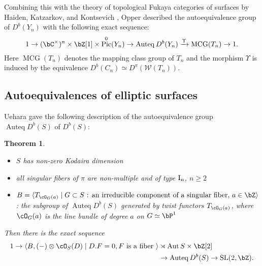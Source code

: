\documentclass[a0,landscape]{a0poster}
\theoremstyle{plain}
\newtheorem{theorem}{Theorem}[section]
\theoremstyle{definition}
\DeclareMathOperator{\Auteq}{\mathrm{Auteq}}
\DeclareMathOperator{\Pic}{\mathrm{Pic}}
\DeclareMathOperator{\MCG}{\mathrm{MCG}}
\DeclareMathOperator{\Aut}{\mathrm{Aut}}
\DeclareMathOperator{\SL}{\mathrm{SL}}
\begin{document}
\begin{multicols}{3}
    Combining this with the theory of topological Fukaya categories of surfaces by Haiden, Katzarkov, and Kontsevich \cite{MR3735868}, Opper \cite{2020arXiv201108288O} described the autoequivalence group of $D^b(Y_n)$ with the following exact sequence:
    \begin{equation}
        1 \to (\bC^\times)^n \times \bZ[1] \times \Pic^0(Y_n) \to \Auteq{D^b(Y_n)} \xrightarrow{\Upsilon} \MCG(T_n) \to 1.
    \end{equation}
    Here $\MCG(T_n)$ denotes the mapping class group of $T_n$ and the morphism $\Upsilon$ is induced by the equivalence $D^b(C_n) \simeq D^\pi(\mathcal{W}(T_n))$.
    \subsection{Autoequivalences of elliptic surfaces}

    Uehara \cite{MR3568337} gave the following description of the autoequivalence group $\Auteq D^b(S)$ of $D^b(S)$:
    \begin{theorem}
        \quad
        \begin{itemize}
            \item $S$ has non-zero Kodaira dimension
            \item all singular fibers of $\pi$ are non-multiple and of type $\rm{I}_n$, $n \geq 2$
            \item  $B = \langle T_{\cO_G(a)} \mid G \subset S \text{ : an irreducible component of a singular fiber, } a \in \bZ \rangle$ : the subgroup of $\Auteq D^b(S)$ generated by twist functors $T_{\cO_G(a)}$, where $\cO_G(a)$ is the line bundle of degree $a$ on $G \simeq \bP^1$
        \end{itemize}

        Then there is the exact sequence
        \begin{align}
            1 \to \langle B, (-)\otimes \cO_S(D)\mid D.F=0, F \textrm{ is a fiber } \rangle & \rtimes \Aut{S} \times \bZ[2]      \\
                                                                                            & \to \Auteq{D^b(S)} \to \SL(2,\bZ).
        \end{align}
    \end{theorem}

\end{multicols}
\end{document}
